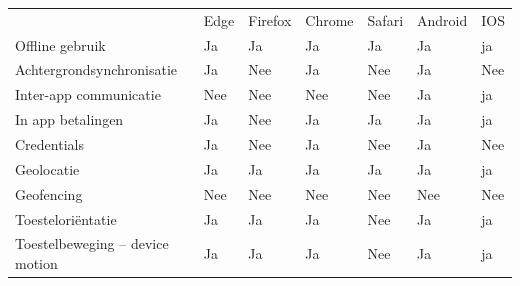  		\begin{table}[]
 			\centering
			\begin{tabular}{p{6cm}p{13mm}p{13mm}p{13mm}p{13mm}p{13mm}p{13mm}}
 			
				& Edge & Firefox & Chrome & Safari& Android & IOS \\ 
			   
			   Offline gebruik & \cellcolor{green!40} Ja  & \cellcolor{green!40} Ja & \cellcolor{green!40} Ja  & \cellcolor{green!40} Ja & \cellcolor{green!40} Ja & \cellcolor{green!40} ja \\
			   
			   Achtergrondsynchronisatie & \cellcolor{green!40} Ja  &  \cellcolor{red!50} Nee& \cellcolor{green!40} Ja  &  \cellcolor{red!50} Nee& \cellcolor{green!40} Ja & \cellcolor{red!50} Nee \\
			   
			   Inter-app communicatie & \cellcolor{red!50} Nee  &  \cellcolor{red!50} Nee& \cellcolor{red!50} Nee  &  \cellcolor{red!50} Nee& \cellcolor{green!40} Ja & \cellcolor{green!40} ja \\
			   
			   In app betalingen & \cellcolor{green!40} Ja  &\cellcolor{red!50} Nee & \cellcolor{green!40} Ja  & \cellcolor{green!40} Ja & \cellcolor{green!40} Ja & \cellcolor{green!40} ja \\
			   
			   Credentials & \cellcolor{green!40} Ja  & \cellcolor{red!50} Nee & \cellcolor{green!40} Ja  & \cellcolor{red!50} Nee & \cellcolor{green!40} Ja & \cellcolor{red!50} Nee \\
			   
			   Geolocatie & \cellcolor{green!40} Ja  & \cellcolor{green!40} Ja & \cellcolor{green!40} Ja  & \cellcolor{green!40} Ja & \cellcolor{green!40} Ja & \cellcolor{green!40} ja \\
			   
			   Geofencing &  \cellcolor{red!50} Nee  &  \cellcolor{red!50} Nee &  \cellcolor{red!50} Nee  & \cellcolor{red!50} Nee &  \cellcolor{red!50} Nee &  \cellcolor{red!50} Nee \\
			   
			   Toesteloriëntatie & \cellcolor{green!40} Ja  & \cellcolor{green!40} Ja & \cellcolor{green!40} Ja  & \cellcolor{red!50} Nee& \cellcolor{green!40} Ja & \cellcolor{green!40} ja \\
			   
			   Toestelbeweging – device motion & \cellcolor{green!40} Ja  & \cellcolor{green!40} Ja & \cellcolor{green!40} Ja  & \cellcolor{red!50} Nee& \cellcolor{green!40} Ja & \cellcolor{green!40} ja \\
			   

\end{tabular}
\end{table}
